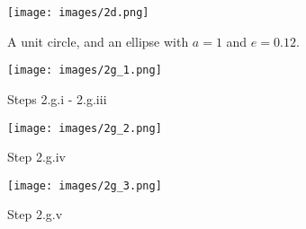 \documentclass[letterpaper, 12pt]{amsart}
\theoremstyle{definition}  %
\begin{document}
		\begin{figure}[h]
			\texttt{[image: images/2d.png]}
			\caption{A unit circle, and an ellipse with $a=1$ and $e=0.12$.}
			\label{circle2}
		\end{figure}

		\begin{figure}[h]
			\texttt{[image: images/2g\_1.png]}
			\caption{Steps 2.g.i - 2.g.iii}
			\label{figs1}
		\end{figure}

		\begin{figure}[h]
			\texttt{[image: images/2g\_2.png]}
			\caption{Step 2.g.iv}
			\label{figs2}
		\end{figure}

		\begin{figure}[h]
			\texttt{[image: images/2g\_3.png]}
			\caption{Step 2.g.v}
			\label{figs3}
		\end{figure}
\end{document}

